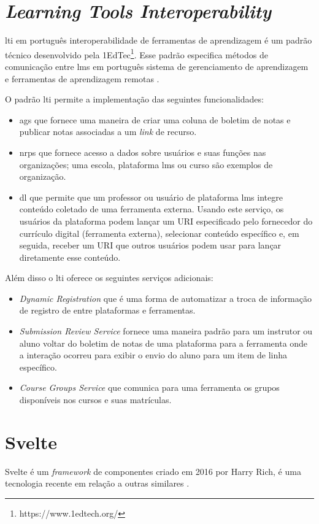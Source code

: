 \section{\textit{Learning Tools Interoperability}}
\gls{lti} em português interoperabilidade de ferramentas de aprendizagem é um padrão técnico desenvolvido pela 1EdTec\footnote{https://www.1edtech.org/}. Esse padrão especifica métodos de comunicação entre \gls{lms} em português sistema de gerenciamento de aprendizagem e ferramentas de aprendizagem remotas \cite{1edtech}.

O padrão \gls{lti} permite a implementação das seguintes funcionalidades:
\begin{itemize}[label=$\sbullet$]
    \item \gls{ags} que fornece uma maneira de criar uma coluna de boletim de notas e publicar notas associadas a um \textit{link} de recurso.
    \item \gls{nrps} que fornece acesso a dados sobre usuários e suas funções nas organizações; uma escola, plataforma \gls{lms} ou curso são exemplos de organização.
    \item \gls{dl} que permite que um professor ou usuário de plataforma \gls{lms} integre conteúdo coletado de uma ferramenta externa. Usando este serviço, os usuários da plataforma podem lançar um URI especificado pelo fornecedor do currículo digital (ferramenta externa), selecionar conteúdo específico e, em seguida, receber um URI que outros usuários podem usar para lançar diretamente esse conteúdo.
\end{itemize}

Além disso o \gls{lti} oferece os seguintes serviços adicionais:

\begin{itemize}[label=$\sbullet$]
    \item \textit{Dynamic Registration} que é uma forma de automatizar a troca de informação de registro de entre plataformas e ferramentas.
    \item \textit{Submission Review Service} fornece uma maneira padrão para um instrutor ou aluno voltar do boletim de notas de uma plataforma para a ferramenta onde a interação ocorreu para exibir o envio do aluno para um item de linha específico.
    \item \textit{Course Groups Service} que comunica para uma ferramenta os grupos disponíveis nos cursos e suas matrículas.
\end{itemize}

\section{Svelte}
Svelte é um \textit{framework} de componentes criado em 2016 por Harry Rich, é uma tecnologia recente em relação a outras similares \cite{krill_slim_2016}.

